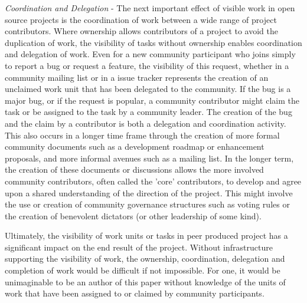 {\it Coordination and Delegation} - The next important effect of visible work in open source projects is the coordination of work between a wide range of project contributors. Where ownership allows contributors of a project to avoid the duplication of work, the visibility of tasks without ownership enables coordination and delegation of work. Even for a new community participant who joins simply to report a bug or request a feature, the visibility of this request, whether in a community mailing list or in a issue tracker represents the creation of an unclaimed work unit that has been delegated to the community. If the bug is a major bug, or if the request is popular, a community contributor might claim the task or be assigned to the task by a community leader. The creation of the bug and the claim by a contributor is both a delegation and coordination activity. This also occurs in a longer time frame through the creation of more formal community documents such as a development roadmap or enhancement proposals, and more informal avenues such as a mailing list. In the longer term, the creation of these documents or discussions allows the more involved community contributors, often called the 'core' contributors, to develop and agree upon a shared understanding of the direction of the project. This might involve the use or creation of community governance structures such as voting rules or the creation of benevolent dictators (or other leadership of some kind).

Ultimately, the visibility of work units or tasks in peer produced project has a significant impact on the end result of the project. Without infrastructure supporting the visibility of work, the ownership, coordination, delegation and completion of work would be difficult if not impossible. For one, it would be unimaginable to be an author of this paper without knowledge of the units of work that have been assigned to or claimed by community participants.
